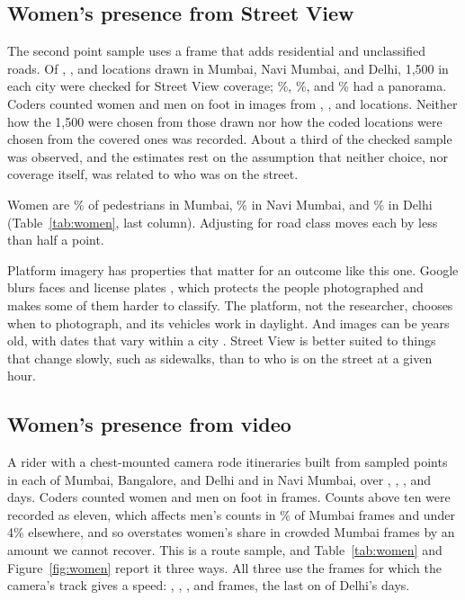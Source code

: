 \documentclass[11pt]{article}
\begin{document}
\subsection{Women's presence from Street View}

The second point sample uses a frame that adds residential and unclassified roads. Of \streetviewdrawnMumbai, \streetviewdrawnNaviMumbai, and \streetviewdrawnDelhi{} locations drawn in Mumbai, Navi Mumbai, and Delhi, 1,500 in each city were checked for Street View coverage; \streetviewcoveredMumbai\%, \streetviewcoveredNaviMumbai\%, and \streetviewcoveredDelhi\% had a panorama. Coders counted women and men on foot in images from \streetviewcodedMumbai, \streetviewcodedNaviMumbai, and \streetviewcodedDelhi{} locations. Neither how the 1,500 were chosen from those drawn nor how the coded locations were chosen from the covered ones was recorded. About a third of the checked sample was observed, and the estimates rest on the assumption that neither choice, nor coverage itself, was related to who was on the street.

Women are \streetviewMumbai\% of pedestrians in Mumbai, \streetviewNaviMumbai\% in Navi Mumbai, and \streetviewDelhi\% in Delhi (Table~\ref{tab:women}, last column). Adjusting for road class moves each by less than half a point.

Platform imagery has properties that matter for an outcome like this one. Google blurs faces and license plates \citep{googleBlurPolicy,frome2009privacy}, which protects the people photographed and makes some of them harder to classify. The platform, not the researcher, chooses when to photograph, and its vehicles work in daylight. And images can be years old, with dates that vary within a city \citep{curtis2013streetviewdates}. Street View is better suited to things that change slowly, such as sidewalks, than to who is on the street at a given hour.

\subsection{Women's presence from video}

A rider with a chest-mounted camera rode itineraries built from \pointsMumbai{} sampled points in each of Mumbai, Bangalore, and Delhi and \pointsNaviMumbai{} in Navi Mumbai, over \daysMumbai, \daysNaviMumbai, \daysBangalore, and \daysDelhi{} days. Coders counted women and men on foot in \framestotal{} frames. Counts above ten were recorded as eleven, which affects men's counts in \topcodedmenMumbai\% of Mumbai frames and under 4\% elsewhere, and so overstates women's share in crowded Mumbai frames by an amount we cannot recover. This is a route sample, and Table~\ref{tab:women} and Figure~\ref{fig:women} report it three ways. All three use the frames for which the camera's track gives a speed: \speedframesMumbai, \speedframesNaviMumbai, \speedframesBangalore, and \speedframesDelhi{} frames, the last on \speeddaysDelhi{} of Delhi's \daysDelhi{} days.
\end{document}
